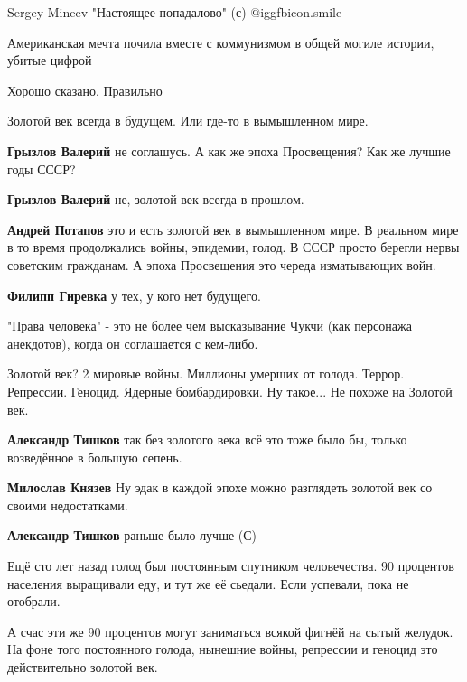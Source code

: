 \begin{itemize}
\begin{itemize}
Sergey Mineev "Настоящее попадалово" (с)  @igg{fbicon.smile} 

\end{itemize} %

Американская мечта почила вместе с коммунизмом в общей могиле истории, убитые цифрой

Хорошо сказано. Правильно

Золотой век всегда в будущем. Или где-то в вымышленном мире.

\begin{itemize} %
\textbf{Грызлов Валерий} не соглашусь. А как же эпоха Просвещения? Как же лучшие годы СССР?

\textbf{Грызлов Валерий} не, золотой век всегда в прошлом.

\textbf{Андрей Потапов} это и есть золотой век в вымышленном мире. В реальном мире в то время продолжались войны, эпидемии, голод. В СССР просто берегли нервы советским гражданам. А эпоха Просвещения это череда изматывающих войн.

\textbf{Филипп Гиревка} у тех, у кого нет будущего.
\end{itemize} %

"Права человека" - это не более чем высказывание Чукчи (как персонажа анекдотов), когда он соглашается с кем-либо.


Золотой век? 2 мировые войны. Миллионы умерших от голода. Террор. Репрессии.
Геноцид. Ядерные бомбардировки. Ну такое... Не похоже на Золотой век.

\begin{itemize} %
\textbf{Александр Тишков} так без золотого века всё это тоже было бы, только возведённое в большую сепень.

\textbf{Милослав Князев} Ну эдак в каждой эпохе можно разглядеть золотой век со своими недостатками.

\textbf{Александр Тишков} раньше было лучше (С)


Ещё сто лет назад голод был постоянным спутником человечества. 90 процентов
населения выращивали еду, и тут же её сьедали. Если успевали, пока не отобрали.

А счас эти же 90 процентов могут заниматься всякой фигнёй на сытый желудок. На
фоне того постоянного голода, нынешние войны, репрессии и геноцид это
действительно золотой век.



\end{itemize}
\end{itemize}
